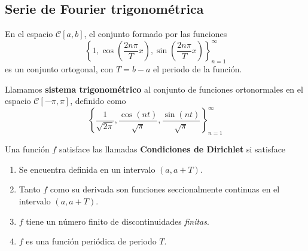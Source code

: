 \subsection{Serie de Fourier trigonométrica}


\begin{propo}
    En el espacio $\mathscr{C}[a,b]$, el conjunto formado por las funciones
    $$\left\{ 1, \cos\left( \frac{2n \pi}{T}x \right), \sin\left( \frac{2n \pi}{T}x \right) \right\}_{n=1}^{\infty}$$
    es un conjunto ortogonal, con $T = b-a$ el periodo de la función.
\end{propo}


\begin{defi} 
    Llamamos \textbf{sistema trigonométrico} al conjunto de funciones ortonormales en el espacio $\mathscr{C}[-\pi,\pi]$, definido como
    $$\left\{ \frac{1}{\sqrt{2\pi}}, \frac{\cos(nt)}{\sqrt{\pi}}, \frac{\sin(nt)}{\sqrt{\pi}} \right\}_{n=1}^{\infty}$$
\end{defi}

\begin{defi} 
    Una función $f$ satisface las llamadas \textbf{Condiciones de Dirichlet} si satisface
    \begin{enumerate}
        \item Se encuentra definida en un intervalo $(a,a+T)$.
        \item Tanto $f$ como su derivada son funciones seccionalmente continuas en el intervalo $(a,a+T)$.
        \item $f$ tiene un número finito de discontinuidades \emph{finitas}.
        \item $f$ es una función periódica de periodo $T$.
    \end{enumerate}

\end{defi}

